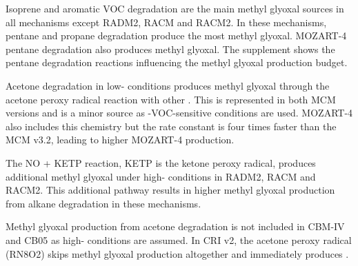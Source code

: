 Isoprene and aromatic VOC degradation are the main methyl glyoxal sources in all mechanisms except RADM2, RACM and RACM2.
In these mechanisms, pentane and propane degradation produce the most methyl glyoxal.
MOZART-4 pentane degradation also produces methyl glyoxal.
The supplement shows the pentane degradation reactions influencing the methyl glyoxal production budget.

Acetone degradation in low- conditions produces methyl glyoxal through the acetone peroxy radical reaction with other  \citep{Fu:2008}.
This is represented in both MCM versions and is a minor source as -VOC-sensitive conditions are used.  
MOZART-4 also includes this chemistry but the rate constant is four times faster than the MCM v3.2, leading to higher MOZART-4 production.

The NO + KETP reaction, KETP is the ketone peroxy radical, produces additional methyl glyoxal under high- conditions in RADM2, RACM and RACM2.
This additional pathway results in higher methyl glyoxal production from alkane degradation in these mechanisms.

Methyl glyoxal production from acetone degradation is not included in CBM-IV and CB05 as high- conditions are assumed.
In CRI v2, the acetone peroxy radical (RN8O2) skips methyl glyoxal production altogether and immediately produces .
